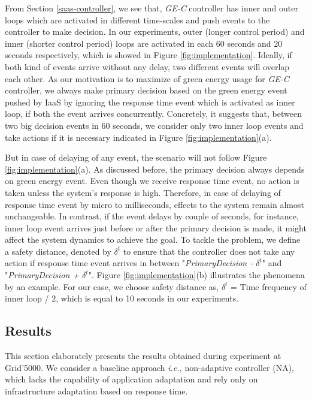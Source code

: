 From Section \ref{saas-controller}, we see that, \emph{GE-C} controller has inner and outer loops which are activated in different time-scales and push events to the controller to make decision. In our experiments, outer (longer control period) and inner (shorter control period) loops are activated in each 60 seconds and 20 seconds respectively, which is showed in Figure \ref{fig:implementation}. Ideally, if both kind of events arrive without any delay, two different events will overlap each other. As our motivation is to maximize of green energy usage for \emph{GE-C} controller, we always make primary decision based on the green energy event pushed by IaaS by ignoring the response time event which is activated as inner loop, if both the event arrives concurrently. Concretely, it suggests that, between two big decision events in 60 seconds, we consider only two inner loop events and take actions if it is necessary indicated in Figure \ref{fig:implementation}(a).

But in case of delaying of any event, the scenario will not follow Figure \ref{fig:implementation}(a). As discussed before, the primary decision always depends on green energy event. Even though we receive response time event, no action is taken unless the system's response is high. Therefore, in case of delaying of response time event by micro to milliseconds, effects to the system remain almost unchangeable. In contrast, if the event delays by couple of seconds, for instance, inner loop event arrives just before or after the primary decision is made, it might affect the system dynamics to achieve the goal. To tackle the problem, we define a safety distance, denoted by $\delta^t$ to ensure that the controller does not take any action if response time event arrives in between "\textit{PrimaryDecision - $\delta^t$}" and "\textit{PrimaryDecision + $\delta^t$}". Figure \ref{fig:implementation}(b) illustrates the phenomena by an example. For our case, we choose safety distance as, $\delta^t$ = Time frequency of inner loop / $2$, which is equal to 10 seconds in our experiments.



\subsection{Results}

This section elaborately presents the results obtained during experiment at Grid'5000. We consider a baseline approach \emph{i.e.,} non-adaptive controller (NA), which lacks the capability of application adaptation and rely only on infrastructure adaptation based on response time.

